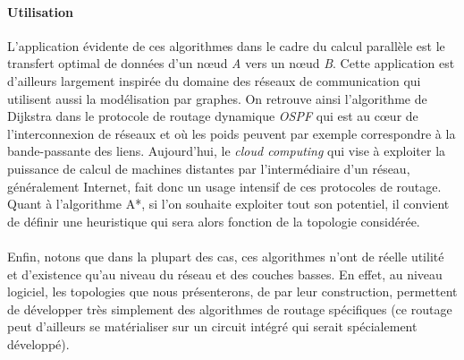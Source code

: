 \paragraph{Utilisation} L'application évidente de ces algorithmes dans le cadre du calcul parallèle est le transfert optimal de données d'un nœud \textit{A} vers un nœud \textit{B}. Cette application est d'ailleurs largement inspirée du domaine des réseaux de communication qui utilisent aussi la modélisation par graphes. On retrouve ainsi l'algorithme de Dijkstra dans le protocole de routage dynamique \textit{OSPF} qui est au cœur de l'interconnexion de réseaux et où les poids peuvent par exemple correspondre à la bande-passante des liens. Aujourd'hui, le \textit{cloud computing} qui vise à exploiter la puissance de calcul de machines distantes par l'intermédiaire d'un réseau, généralement Internet, fait donc un usage intensif de ces protocoles de routage. Quant à l'algorithme A*, si l'on souhaite exploiter tout son potentiel, il convient de définir une heuristique qui sera alors fonction de la topologie considérée.

\paragraph{} Enfin, notons que dans la plupart des cas, ces algorithmes n'ont de réelle utilité et d'existence qu'au niveau du réseau et des couches basses. En effet, au niveau logiciel, les topologies que nous présenterons, de par leur construction, permettent de développer très simplement des algorithmes de routage spécifiques (ce routage peut d'ailleurs se matérialiser sur un circuit intégré qui serait spécialement développé).